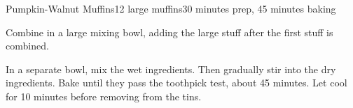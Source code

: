 \documentclass[../Cookbook.tex]{subfiles}
\begin{document}
\begin{recipe}{Pumpkin-Walnut Muffins}{12 large muffins}{30 minutes prep, 45 minutes baking}

Combine in a large mixing bowl, adding the large stuff after the first stuff is combined.

In a separate bowl, mix the wet ingredients.
Then gradually stir into the dry ingredients. Bake until they pass the toothpick test, about 45 minutes. Let cool for 10 minutes before removing from the tins.


\end{recipe}
\end{document}
